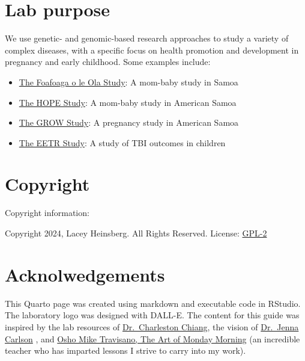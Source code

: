 \documentclass[
  letterpaper,
  DIV=11,
  numbers=noendperiod]{scrreprt}
\providecommand{\tightlist}{%
  \setlength{\itemsep}{0pt}\setlength{\parskip}{0pt}}\usepackage{longtable,booktabs,array}
\begin{document}
\section*{Lab purpose}\label{lab-purpose}


We use genetic- and genomic-based research approaches to study a variety
of complex diseases, with a specific focus on health promotion and
development in pregnancy and early childhood. Some examples include:

\begin{itemize}
\tightlist
\item
  \href{./foafoaga.qmd}{The Foafoaga o le Ola Study}: A mom-baby study
  in Samoa
\item
  \href{./hope.qmd}{The HOPE Study}: A mom-baby study in American Samoa
\item
  \href{./grow.qmd}{The GROW Study}: A pregnancy study in American Samoa
\item
  \href{./eetr.qmd}{The EETR Study}: A study of TBI outcomes in children
\end{itemize}

\section*{Copyright}\label{copyright}


Copyright information:

Copyright 2024, Lacey Heinsberg. All Rights Reserved. License:
\href{https://www.gnu.org/licenses/old-licenses/gpl-2.0.en.html}{GPL-2}

\section*{Acknolwedgements}\label{acknolwedgements}


This Quarto page was created using markdown and executable code in
RStudio. The laboratory logo was designed with DALL-E. The content for
this guide was inspired by the lab resources of
\href{https://chianglab.usc.edu/resources.html}{Dr.~Charleston Chiang},
the vision of
\href{https://www.publichealth.pitt.edu/directory/jenna-carlson}{Dr.~Jenna
Carlson} , and \href{https://www.theartofmondaymorning.com/}{Osho Mike
Travisano, The Art of Monday Morning} (an incredible teacher who has
imparted lessons I strive to carry into my work).
\end{document}
